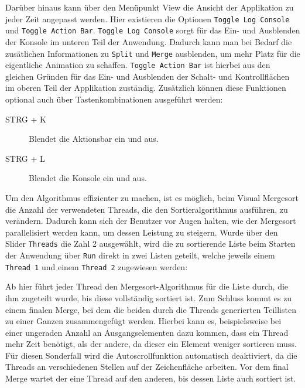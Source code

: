 Darüber hinaus kann über den Menüpunkt View die Ansicht der Applikation zu jeder Zeit angepasst werden. Hier existieren die Optionen
\texttt{Toggle Log Console} und \texttt{Toggle Action Bar}. \texttt{Toggle Log Console} sorgt für das Ein- und Ausblenden der Konsole
im unteren Teil der Anwendung. Dadurch kann man bei Bedarf die zusätlichen Informationen zu \texttt{Split} und \texttt{Merge} ausblenden,
um mehr Platz für die eigentliche Animation zu schaffen. \texttt{Toggle Action Bar} ist hierbei aus den gleichen Gründen für das Ein- und Ausblenden
der Schalt- und Kontrollflächen im oberen Teil der Applikation zuständig. Zusätzlich können diese Funktionen optional auch über Tastenkombinationen ausgeführt
werden:

\begin{description}
\item[STRG + K] Blendet die Aktionsbar ein und aus.


\item[STRG + L] Blendet die Konsole ein und aus.

\end{description}

Um den Algorithmus effizienter zu machen, ist es möglich, beim Visual Mergesort die Anzahl der verwendeten Threads, die den Sortieralgorithmus ausführen, zu verändern. Dadurch kann sich der Benutzer vor Augen halten, wie der Mergesort parallelisiert werden kann, um dessen Leistung zu steigern. Wurde über den Slider \texttt{Threads} die Zahl 2 ausgewählt, wird die zu sortierende Liste beim Starten der Anwendung über \texttt{Run} direkt in zwei Listen geteilt, welche jeweils einem \texttt{Thread 1} und einem \texttt{Thread 2} zugewiesen werden:


Ab hier führt jeder Thread den Mergesort-Algorithmus für die Liste durch, die ihm zugeteilt wurde, bis diese vollständig sortiert ist. Zum Schluss kommt es zu einem finalen Merge, bei dem die beiden durch die Threads generierten Teillisten zu einer Ganzen zusammengefügt werden. Hierbei kann es, beispielsweise bei einer ungeraden Anzahl an Ausgangselementen dazu kommen, dass ein Thread mehr Zeit benötigt, als der andere, da dieser ein Element weniger sortieren muss. Für diesen Sonderfall wird die Autoscrollfunktion automatisch deaktiviert, da die Threads an verschiedenen Stellen auf der Zeichenfläche arbeiten. Vor dem final Merge wartet der eine Thread auf den anderen, bis dessen Liste auch sortiert ist.

